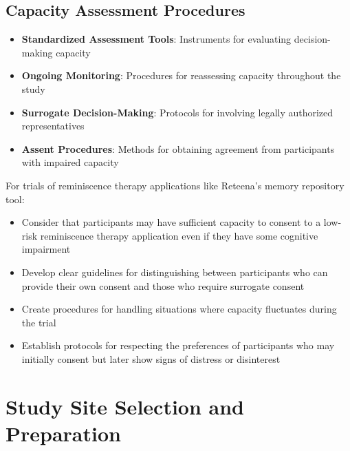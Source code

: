 \subsection{Capacity Assessment Procedures}
\begin{itemize}
    \item \textbf{Standardized Assessment Tools}: Instruments for evaluating decision-making capacity
    
    \item \textbf{Ongoing Monitoring}: Procedures for reassessing capacity throughout the study
    
    \item \textbf{Surrogate Decision-Making}: Protocols for involving legally authorized representatives
    
    \item \textbf{Assent Procedures}: Methods for obtaining agreement from participants with impaired capacity
\end{itemize}

\begin{tcolorbox}[infobox, title=Capacity Considerations for Reminiscence Therapy Applications]
For trials of reminiscence therapy applications like Reteena's memory repository tool:
\begin{itemize}
    \item Consider that participants may have sufficient capacity to consent to a low-risk reminiscence therapy application even if they have some cognitive impairment
    
    \item Develop clear guidelines for distinguishing between participants who can provide their own consent and those who require surrogate consent
    
    \item Create procedures for handling situations where capacity fluctuates during the trial
    
    \item Establish protocols for respecting the preferences of participants who may initially consent but later show signs of distress or disinterest
\end{itemize}
\end{tcolorbox}

\section{Study Site Selection and Preparation}
